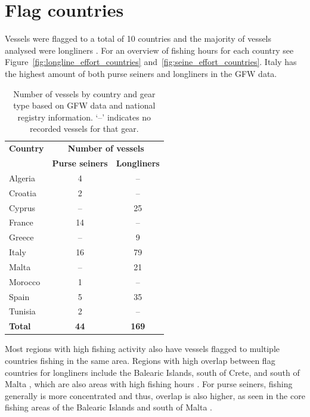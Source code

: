 \FloatBarrier
\section{Flag countries}

Vessels were flagged to a total of 10 countries and the majority of vessels analysed were longliners . 
For an overview of fishing hours for each country see Figure~\ref{fig:longline_effort_countries} and~\ref{fig:seine_effort_countries}.
Italy has the highest amount of both purse seiners and longliners in the GFW data.

\medskip

\begin{table}[h]
\centering
\caption{Number of vessels by country and gear type based on GFW data and national registry information. ‘--’ indicates no recorded vessels for that gear.}
\medskip
\begin{tabular}{lcc}
\toprule
\textbf{Country} & \multicolumn{2}{c}{\textbf{Number of vessels}} \\
\cmidrule(lr){2-3}
                 & \textbf{Purse seiners} & \textbf{Longliners} \\
\midrule
Algeria   & 4   & -- \\
Croatia   & 2   & -- \\
Cyprus    & --  & 25 \\
France    & 14  & -- \\
Greece    & --  & 9 \\
Italy     & 16  & 79 \\
Malta     & --  & 21 \\
Morocco   & 1   & -- \\
Spain     & 5   & 35 \\
Tunisia   & 2   & -- \\
\midrule
\textbf{Total}   & \textbf{44} & \textbf{169} \\
\bottomrule
\end{tabular}
\label{tab:countries_vessels}
\end{table}

Most regions with high fishing activity also have vessels flagged to multiple countries fishing in the same area. Regions with high overlap between flag countries
for longliners include the Balearic Islands, south of Crete, and south of Malta , which are also areas with high fishing hours .
For purse seiners, fishing generally is more concentrated and thus, overlap is also higher, as seen in the core fishing areas of the Balearic Islands and south of Malta .

